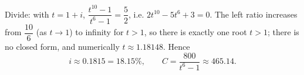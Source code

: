 Divide: with $t=1+i$, $\dfrac{t^{10}-1}{t^6-1}=\dfrac{5}{2}$, i.e. $2t^{10}-5t^6+3=0$. The left ratio increases from $\dfrac{10}{6}$ (as $t\to1$) to infinity for $t>1$, so there is exactly one root $t>1$; there is no closed form, and numerically $t\approx1.18148$. Hence
\[i\approx0.1815=18.15\%,\qquad C=\dfrac{800}{t^6-1}\approx\boxed{465.14}.\]
